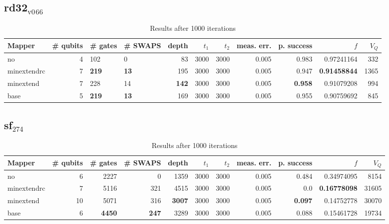 \documentclass[11pt]{article}
\begin{document}
\subsection{rd32\(_{\text{v0}}\)\(_{\text{66}}\)}
\label{sec:org2f7ddd7}
\begin{table}[H]
\caption{\label{tab:orgcc2877d}
Results after 1000 iterations}
\centering
\small
\begin{tabular}{lrllrrrrrrr}
\hline
Mapper & \# qubits & \# gates & \# SWAPS & depth & \(t_1\) & \(t_2\) & meas. err. & p. success & \(f\) & \(V_Q\)\\
\hline
no & 4 & 102 & 0 & 83 & 3000 & 3000 & 0.005 & 0.983 & 0.97241164 & 332\\
\hline
minextendrc & 7 & \textbf{219} & \textbf{13} & 195 & 3000 & 3000 & 0.005 & 0.947 & \textbf{0.91458844} & 1365\\
minextend & 7 & 228 & 14 & \textbf{142} & 3000 & 3000 & 0.005 & \textbf{0.958} & 0.91079208 & 994\\
base & 5 & \textbf{219} & \textbf{13} & 169 & 3000 & 3000 & 0.005 & 0.955 & 0.90759692 & 845\\
\hline
\end{tabular}
\end{table}
\subsection{sf\(_{\text{274}}\)}
\label{sec:orgb94973e}
\begin{table}[H]
\caption{\label{tab:org90c823e}
Results after 1000 iterations}
\centering
\small
\begin{tabular}{lrrrrrrrrrr}
\hline
Mapper & \# qubits & \# gates & \# SWAPS & depth & \(t_1\) & \(t_2\) & meas. err. & p. success & \(f\) & \(V_Q\)\\
\hline
no & 6 & 2227 & 0 & 1359 & 3000 & 3000 & 0.005 & 0.484 & 0.34974095 & 8154\\
\hline
minextendrc & 7 & 5116 & 321 & 4515 & 3000 & 3000 & 0.005 & 0.0 & \textbf{0.16778098} & 31605\\
minextend & 10 & 5071 & 316 & \textbf{3007} & 3000 & 3000 & 0.005 & \textbf{0.097} & 0.14752778 & 30070\\
base & 6 & \textbf{4450} & \textbf{247} & 3289 & 3000 & 3000 & 0.005 & 0.088 & 0.15461728 & 19734\\
\hline
\end{tabular}
\end{table}
\end{document}
